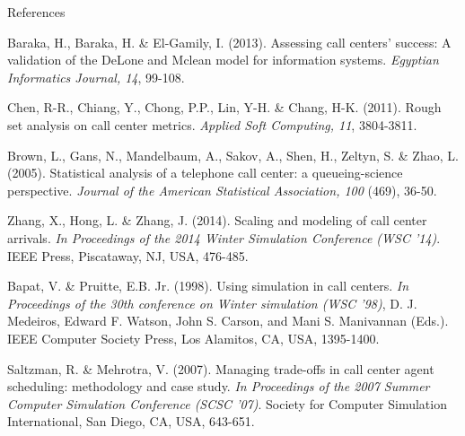 \documentclass{beamer}
\begin{document}
\begin{frame}{References}
    \begin{itemize}
    \scriptsize{
        \item Baraka, H., Baraka, H. \& El-Gamily, I. (2013). Assessing call centers’ success: A validation of the DeLone and Mclean model for information systems. \textit{Egyptian Informatics Journal, 14}, 99-108.
        
        \item Chen, R-R., Chiang, Y., Chong, P.P., Lin, Y-H. \& Chang, H-K. (2011). Rough set analysis on call center metrics. \textit{Applied Soft Computing, 11}, 3804-3811.
        
        \item Brown, L., Gans, N., Mandelbaum, A., Sakov, A., Shen, H., Zeltyn, S. \& Zhao, L. (2005).
        Statistical analysis of a telephone call center: a queueing-science perspective. \textit{Journal of the
        American Statistical Association, 100} (469), 36-50.
        
        \item Zhang, X., Hong, L. \& Zhang, J. (2014). Scaling and modeling of call center arrivals. \textit{In
        Proceedings of the 2014 Winter Simulation Conference (WSC '14)}. IEEE Press, Piscataway, NJ,
        USA, 476-485.
        
        \item Bapat, V. \& Pruitte, E.B. Jr. (1998). Using simulation in call centers. \textit{In Proceedings of the
        30th conference on Winter simulation (WSC '98)}, D. J. Medeiros, Edward F. Watson, John S.
        Carson, and Mani S. Manivannan (Eds.). IEEE Computer Society Press, Los Alamitos, CA,
        USA, 1395-1400.
        
        \item Saltzman, R. \& Mehrotra, V. (2007). Managing trade-offs in call center agent scheduling:
        methodology and case study. \textit{In Proceedings of the 2007 Summer Computer Simulation Conference (SCSC '07)}. Society for Computer Simulation International, San Diego, CA, USA, 643-651.
        
        }
    \end{itemize}
\end{frame}
\end{document}
